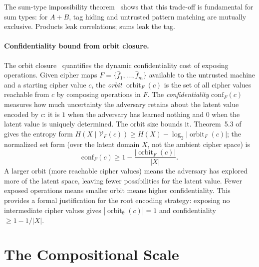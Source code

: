 \documentclass[11pt]{article}
\theoremstyle{definition}
\theoremstyle{plain}
\theoremstyle{remark}
\newcommand{\fhat}{\hat{f}}
\DeclareMathOperator{\orbitF}{orbit}
\begin{document}
The sum-type impossibility theorem~\cite[Thm.~4.2]{towell2026algebraic}
shows that this trade-off is fundamental for sum types: for
$A + B$, tag hiding and untrusted pattern matching are mutually
exclusive.  Products leak correlations; sums leak the tag.

\paragraph{Confidentiality bound from orbit closure.}
The orbit closure~\cite[Sec.~5]{towell2026algebraic} quantifies the
dynamic confidentiality cost of exposing operations.  Given cipher maps
$F = \{\fhat_1, \ldots, \fhat_m\}$ available to the untrusted machine
and a starting cipher value $c$, the \emph{orbit}
$\orbitF_F(c)$ is the set of all cipher values reachable from $c$ by
composing operations in $F$.  The \emph{confidentiality}
$\mathrm{conf}_F(c)$ measures how much uncertainty the adversary retains
about the latent value encoded by $c$: it is $1$ when the adversary has
learned nothing and $0$ when the latent value is uniquely determined.
The orbit size bounds it.  Theorem~5.3
of~\cite{towell2026algebraic} gives the entropy form
$H(X \mid \mathcal{V}_F(c)) \geq H(X) - \log_2|\orbitF_F(c)|$; the
normalized set form (over the latent domain $X$, not the ambient
cipher space) is
\begin{equation}
\mathrm{conf}_F(c) \geq 1 - \frac{|\orbitF_F(c)|}{|X|}.
\end{equation}
A larger orbit (more reachable cipher values) means the adversary has
explored more of the latent space, leaving fewer possibilities for the
latent value.  Fewer exposed operations means smaller orbit means higher
confidentiality.  This provides a formal justification for the root
encoding strategy: exposing no intermediate cipher values gives
$|\orbitF_\emptyset(c)| = 1$ and confidentiality $\geq 1 - 1/|X|$.


\section{The Compositional Scale}
\label{sec:composition}
\end{document}
